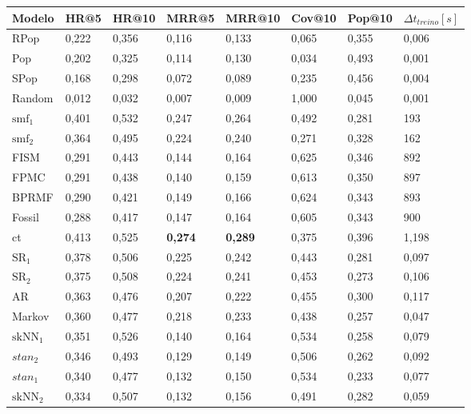 \begin{table}[htbp]
  \centering
  \begin{tabular}{|l|l|l|l|l|l|l|l|}
    \hline
    Modelo & HR@5 & HR@10 & MRR@5 & MRR@10 & Cov@10 & Pop@10 & $\Delta t_{treino} [s]$ \\
    \hline
    RPop & 0,222 & 0,356 & 0,116 & 0,133 & 0,065 & 0,355 & 0,006 \\
    \hline
    Pop & 0,202 & 0,325 & 0,114 & 0,130 & 0,034 & 0,493 & 0,001 \\
    \hline
    SPop & 0,168 & 0,298 & 0,072 & 0,089 & 0,235 & 0,456 & 0,004 \\
    \hline
    Random & 0,012 & 0,032 & 0,007 & 0,009 & 1,000 & 0,045 & 0,001 \\
    \hline
    \hline
    $\text{smf}_{1}$ & 0,401 & 0,532 & 0,247 & 0,264 & 0,492 & 0,281 & 193 \\
    \hline
    $\text{smf}_{2}$ & 0,364 & 0,495 & 0,224 & 0,240 & 0,271 & 0,328 & 162 \\
    \hline
    FISM & 0,291 & 0,443 & 0,144 & 0,164 & 0,625 & 0,346 & 892 \\
    \hline
    FPMC & 0,291 & 0,438 & 0,140 & 0,159 & 0,613 & 0,350 & 897 \\
    \hline
    BPRMF & 0,290 & 0,421 & 0,149 & 0,166 & 0,624 & 0,343 & 893 \\
    \hline
    Fossil & 0,288 & 0,417 & 0,147 & 0,164 & 0,605 & 0,343 & 900 \\
    \hline
    \hline
    ct & 0,413 & 0,525 & \textbf{0{,}274} & \textbf{0{,}289} & 0,375 & 0,396 & 1,198 \\
    \hline
    $\text{SR}_{1}$ & 0,378 & 0,506 & 0,225 & 0,242 & 0,443 & 0,281 & 0,097 \\
    \hline
    $\text{SR}_{2}$ & 0,375 & 0,508 & 0,224 & 0,241 & 0,453 & 0,273 & 0,106 \\
    \hline
    AR & 0,363 & 0,476 & 0,207 & 0,222 & 0,455 & 0,300 & 0,117 \\
    \hline
    Markov & 0,360 & 0,477 & 0,218 & 0,233 & 0,438 & 0,257 & 0,047 \\
    \hline
    $\text{skNN}_{1}$ & 0,351 & 0,526 & 0,140 & 0,164 & 0,534 & 0,258 & 0,079 \\
    \hline
    $stan_{2}$ & 0,346 & 0,493 & 0,129 & 0,149 & 0,506 & 0,262 & 0,092 \\
    \hline
    $stan_{1}$ & 0,340 & 0,477 & 0,132 & 0,150 & 0,534 & 0,233 & 0,077 \\
    \hline
    $\text{skNN}_{2}$ & 0,334 & 0,507 & 0,132 & 0,156 & 0,491 & 0,282 & 0,059 \\

\end{tabular}
\end{table}
